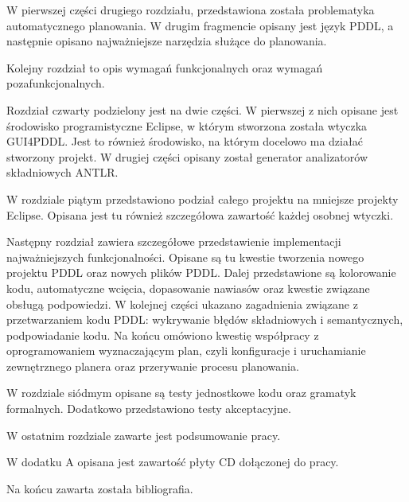 W pierwszej części drugiego rozdziału, przedstawiona została problematyka automatycznego planowania. W drugim fragmencie opisany jest język PDDL, a następnie opisano najważniejsze narzędzia służące do planowania.

Kolejny rozdział to opis wymagań funkcjonalnych oraz wymagań pozafunkcjonalnych.

Rozdział czwarty podzielony jest na dwie części. W pierwszej z nich opisane jest środowisko programistyczne Eclipse, w którym stworzona została wtyczka GUI4PDDL. Jest to również środowisko, na którym docelowo ma działać stworzony projekt. W drugiej części opisany został generator analizatorów składniowych ANTLR.

W rozdziale piątym przedstawiono podział całego projektu na mniejsze projekty Eclipse. Opisana jest tu również szczegółowa zawartość każdej osobnej wtyczki.

Następny rozdział zawiera szczegółowe przedstawienie implementacji najważniejszych funkcjonalności. Opisane są tu kwestie tworzenia nowego projektu PDDL oraz nowych plików PDDL. Dalej przedstawione są kolorowanie kodu, automatyczne wcięcia, dopasowanie nawiasów oraz kwestie związane obsługą podpowiedzi. W kolejnej części ukazano zagadnienia związane z przetwarzaniem kodu PDDL: wykrywanie błędów składniowych i semantycznych, podpowiadanie kodu. Na końcu omówiono kwestię współpracy z oprogramowaniem wyznaczającym plan, czyli konfiguracje i uruchamianie zewnętrznego planera oraz przerywanie procesu planowania.

W rozdziale siódmym opisane są testy jednostkowe kodu oraz gramatyk formalnych. Dodatkowo przedstawiono testy akceptacyjne.

W ostatnim rozdziale zawarte jest podsumowanie pracy.

W dodatku A opisana jest zawartość płyty CD dołączonej do pracy.

Na końcu zawarta została bibliografia.
